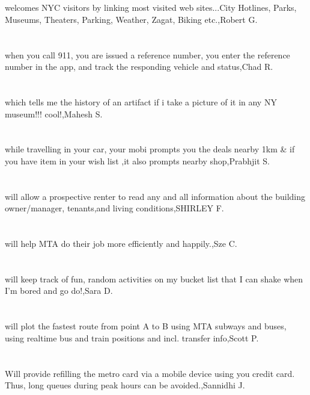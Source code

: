\section{}welcomes NYC visitors by linking most visited web sites...City Hotlines, Parks, Museums, Theaters, Parking, Weather, Zagat, Biking etc.,Robert G.	
\section{}when you call 911, you are issued a reference number, you enter the reference number in the app, and track the responding vehicle and status,Chad R.	
\section{}which tells me the history of an artifact if i take a picture of it in any NY museum!!! cool!,Mahesh S.	
\section{}while travelling in your car, your mobi prompts you the deals nearby 1km \& if you have item in your wish list ,it also prompts nearby shop,Prabhjit S.	
\section{}will allow a prospective renter to read any and all information about the building owner/manager, tenants,and living conditions,SHIRLEY F.	
\section{}will help MTA do their job more efficiently and happily.,Sze C.	
\section{}will keep track of fun, random activities on my bucket list that I can shake when I'm bored and go do!,Sara D.	
\section{}will plot the fastest route from point A to B using MTA subways and buses, using realtime bus and train positions and incl. transfer info,Scott P.	
\section{}Will provide refilling the metro card via a mobile device using you credit card. Thus, long queues during peak hours can be avoided.,Sannidhi J.	
